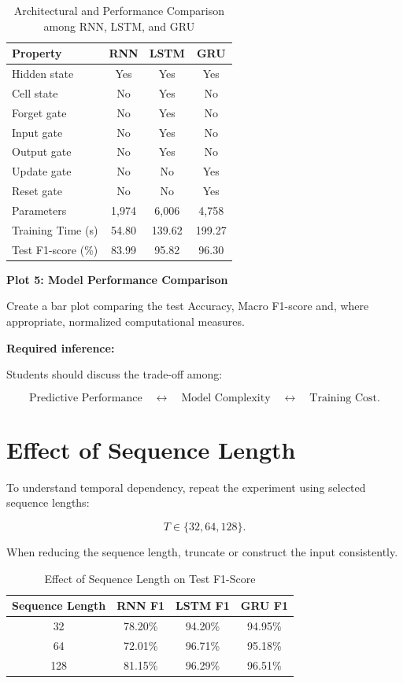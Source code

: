 \documentclass[10pt]{article}
\begin{document}
\begin{table}[H]
\centering
\begin{tabular}{|l|c|c|c|}
\hline
Property & RNN & LSTM & GRU\\
\hline
Hidden state & Yes & Yes & Yes\\
Cell state & No & Yes & No\\
Forget gate & No & Yes & No\\
Input gate & No & Yes & No\\
Output gate & No & Yes & No\\
Update gate & No & No & Yes\\
Reset gate & No & No & Yes\\
Parameters & 1,974 & 6,006 & 4,758 \\
Training Time (s) & 54.80 & 139.62 & 199.27 \\
Test F1-score (\%) & 83.99 & 95.82 & 96.30 \\
\hline
\end{tabular}
\caption{Architectural and Performance Comparison among RNN, LSTM, and GRU}
\label{tab:rnn_lstm_gru_comparison}
\end{table}

\textbf{Plot 5: Model Performance Comparison}

Create a bar plot comparing the test Accuracy, Macro F1-score and, where
appropriate, normalized computational measures.

\textbf{Required inference:}

Students should discuss the trade-off among:

\[
\text{Predictive Performance}
\quad\leftrightarrow\quad
\text{Model Complexity}
\quad\leftrightarrow\quad
\text{Training Cost}.
\]

\section{Effect of Sequence Length}

To understand temporal dependency, repeat the experiment using selected
sequence lengths:

\[
T\in\{32,64,128\}.
\]

When reducing the sequence length, truncate or construct the input consistently.

\begin{table}[H]
\centering
\begin{tabular}{|c|c|c|c|}
\hline
Sequence Length & RNN F1 & LSTM F1 & GRU F1\\
\hline
32 & 78.20\% & 94.20\% & 94.95\%\\
64 & 72.01\% & 96.71\% & 95.18\% \\
128 & 81.15\% & 96.29\% & 96.51\% \\
\hline
\end{tabular}
\caption{Effect of Sequence Length on Test F1-Score}
\label{tab:seq_length_f1}
\end{table}
\end{document}
